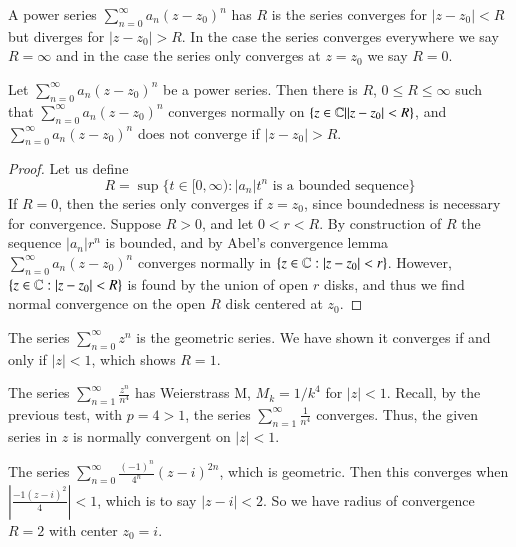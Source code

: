 \begin{definition}
    A power series $\sum_{n=0}^{\infty}a_n(z-z_0)^n$ has  $R$ is the series converges for $|z-z_0| < R$ but diverges for $|z-z_0| > R$. In the case the series converges everywhere we say $R = \infty$ and in the case the series only converges at $z = z_0$ we say $R = 0$.
\end{definition}

\begin{theorem}
    Let $\sum_{n=0}^{\infty}a_n(z-z_0)^n$ be a power series. Then there is $R$, $0 \leq R \leq \infty$ such that $\sum_{n=0}^{\infty}a_n(z-z_0)^n$ converges normally on $\{z \in \mathbb C\vert |z-z_0| < R\}$, and $\sum_{n=0}^{\infty}a_n(z-z_0)^n$ does not converge if $|z-z_0| > R$.
\end{theorem}
\begin{proof}
    Let us define \begin{equation*}
        R = \sup\{t \in [0,\infty):|a_n|t^n\text{ is a bounded sequence}\}
    \end{equation*}
    If $R = 0$, then the series only converges if $z = z_0$, since boundedness is necessary for convergence. Suppose $R > 0$, and let $0 < r < R$. By construction of $R$ the sequence $|a_n|r^n$ is bounded, and by Abel's convergence lemma $\sum_{n=0}^{\infty}a_n(z-z_0)^n$ converges normally in $\{z \in \mathbb C:|z-z_0| < r\}$. However, $\{z\in \mathbb C:|z-z_0| < R\}$ is found by the union of open $r$ disks, and thus we find normal convergence on the open $R$ disk centered at $z_0$. 
\end{proof}


\begin{example}
    The series $\sum_{n=0}^{\infty}z^n$ is the geometric series. We have shown it converges if and only if $|z| < 1$, which shows $R = 1$.
\end{example}

\begin{example}
    The series $\sum_{n=1}^{\infty}\frac{z^n}{n^4}$ has Weierstrass M, $M_k = 1/k^4$ for $|z| < 1$. Recall, by the previous test, with $p = 4 > 1$, the series $\sum_{n=1}^{\infty}\frac{1}{n^4}$ converges. Thus, the given series in $z$ is normally convergent on $|z| <1$.
\end{example}

\begin{example}
    The series $\sum_{n=0}^{\infty}\frac{(-1)^n}{4^n}(z-i)^{2n}$, which is geometric. Then this converges when $\left|\frac{-1(z-i)^2}{4}\right| < 1$, which is to say $|z-i| < 2$. So we have radius of convergence $R = 2$ with center $z_0 = i$.
\end{example}

